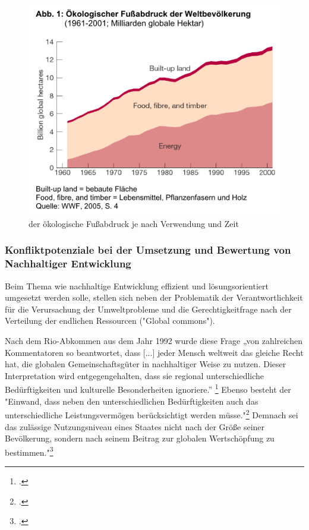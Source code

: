 \documentclass{scrartcl}
\begin{document}
\begin{figure}[htbp]
\centering
\includegraphics[width=12cm]{image_folder/oekFussabdruckZeit.png}
\caption{der ökologische Fußabdruck je nach Verwendung und Zeit}
\label{fig: oekFussabdruckZeit}
\end{figure}

\subsubsection{Konfliktpotenziale bei der Umsetzung und Bewertung von Nachhaltiger Entwicklung}

Beim Thema wie nachhaltige Entwicklung effizient und lösungsorientiert umgesetzt werden solle, stellen sich neben der Problematik der Verantwortlichkeit für die Verursachung der Umweltprobleme und die Gerechtigkeitfrage nach der Verteilung der endlichen Ressourcen ("Global commons"). 

Nach dem Rio-Abkommen aus dem Jahr 1992 wurde diese Frage „von zahlreichen Kommentatoren so beantwortet, dass [...] jeder Mensch weltweit das gleiche Recht hat, die globalen Gemeinschaftsgüter in nachhaltiger Weise zu nutzen. Dieser Interpretation wird entgegengehalten, dass sie regional unterschiedliche Bedürftigkeiten und kulturelle Besonderheiten ignoriere.” \footcite{NachhaltigeBrockhaus.de} Ebenso besteht der "Einwand, dass neben den unterschiedlichen Bedürftigkeiten auch das unterschiedliche Leistungsvermögen berücksichtigt werden müsse."\footcite{NachhaltigeBrockhaus.de} Demnach sei das zulässige Nutzungsniveau eines Staates nicht nach der Größe seiner Bevölkerung, sondern nach seinem Beitrag zur globalen Wertschöpfung zu bestimmen."\footcite{NachhaltigeBrockhaus.de}
\end{document}
